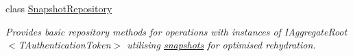 \begin{DoxyCompactItemize}
class \hyperlink{classCqrs_1_1Snapshots_1_1SnapshotRepository}{Snapshot\+Repository}
\begin{DoxyCompactList}\small\item\em Provides basic repository methods for operations with instances of I\+Aggregate\+Root$<$\+T\+Authentication\+Token$>$ utilising \hyperlink{classCqrs_1_1Snapshots_1_1Snapshot}{snapshots} for optimised rehydration. \end{DoxyCompactList}\end{DoxyCompactItemize}

